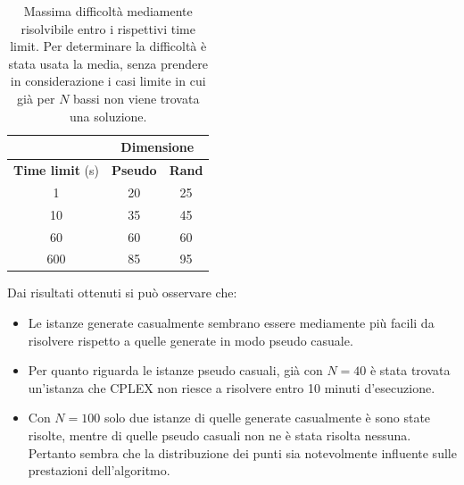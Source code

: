 \begin{table}[htbp]
	\centering
	\begin{tabular}{c|c|c|}
		\cline{2-3}
		& \multicolumn{2}{c|}{\textbf{Dimensione}} \\ \hline
		\multicolumn{1}{|c|}{\textbf{Time limit} (s)} & \textbf{Pseudo}      & \textbf{Rand}     \\ \hline
		\multicolumn{1}{|c|}{1}                   & 20                   & 25                \\ \hline
		\multicolumn{1}{|c|}{10}                  & 35                   & 45                \\ \hline
		\multicolumn{1}{|c|}{60}                  & 60                   & 60                \\ \hline
		\multicolumn{1}{|c|}{600}                 & 85                   & 95               \\ \hline
	\end{tabular}
	\caption{Massima difficoltà mediamente risolvibile entro i rispettivi time limit. Per determinare la difficoltà è stata usata la media, senza prendere in considerazione i casi limite in cui già per $N$ bassi non viene trovata una soluzione.}
	\label{tab:cplex-recap}
\end{table}

Dai risultati ottenuti si può osservare che:

\begin{itemize}
	\item Le istanze generate casualmente sembrano essere mediamente più facili da risolvere rispetto a quelle generate in modo pseudo casuale.
	\item Per quanto riguarda le istanze pseudo casuali, già con $N=40$ è stata trovata un'istanza che CPLEX non riesce a risolvere entro 10 minuti d'esecuzione.
	\item Con $N = 100$ solo due istanze di quelle generate casualmente è sono state risolte, mentre di quelle pseudo casuali non ne è stata risolta nessuna. Pertanto sembra che la distribuzione dei punti sia notevolmente influente sulle prestazioni dell'algoritmo.
\end{itemize}
